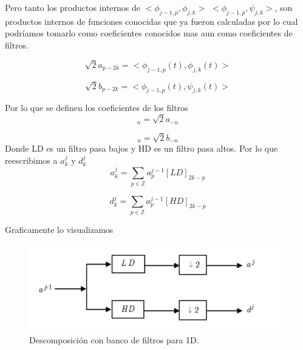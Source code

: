 \documentclass{beamer}
\begin{document}
  \begin{frame}
  Pero tanto los productos internos de $<\phi_{j-1,p},\phi_{j,k}>$ $<\phi_{j-1,p},\psi_{j,k}>$, son productos internos de funciones conocidas que ya fueron calculadas por lo cual podríamos tomarlo como coeficientes conocidos mas aun como coeficientes de filtros.
  
\begin{equation}
	\sqrt{2} a_{p-2k}=<\phi _{j-1,p}(t),\phi _{j,k}(t)>
\end{equation}
	
\begin{equation}
	\sqrt{2} b_{p-2k}=<\phi _{j-1,p}(t),\psi _{j,k}(t)>
\end{equation}
  
  \end{frame}
\begin{frame}
Por lo que se definen los coeficientes de los filtros 
\begin{equation}
[LD]_{n}=\sqrt{2}  a_{-n}
\end{equation}

\begin{equation}
[HD]_{n}=\sqrt{2}  b_{-n}
\end{equation}
Donde LD es un filtro pasa bajos y HD es un filtro pasa altos.
Por lo que reescribimos a $a^{j}_k$ y $d^{j}_k$
\begin{equation}
\label{afinal}
a^{j}_{k}=\sum_{p \in \mathbb Z} a^{j-1}_{p} [LD]_{2k-p}
\end{equation}

\begin{equation}
\label{dfinal}
d^{j}_{k}=\sum_{p \in \mathbb Z} a^{j-1}_{p} [HD]_{2k-p}
\end{equation}

\end{frame}
\begin{frame}
Graficamente lo visualizamos
\begin{figure}[htb]
	\centering
	\includegraphics[width=.75\textwidth]{imgs/bancofiltros1D}
	\caption{Descomposición con banco de filtros para 1D.}
	\label{bancofiltros1D}
\end{figure}
\end{frame}
\end{document}
